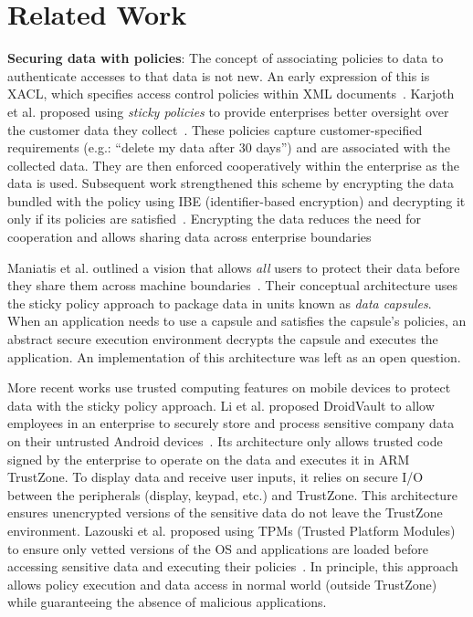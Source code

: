 \chapter{Related Work}
\label{sec:related}

\textbf{Securing data with policies}: The concept of associating policies to
data to authenticate accesses to that data is not new. An early expression of
this is XACL, which specifies access control policies within XML
documents~\cite{xacl}. Karjoth et al. proposed using {\em sticky policies} to
provide enterprises better oversight over the customer data they
collect~\cite{karjoth02enterprise}. These policies capture customer-specified
requirements (e.g.: ``delete my data after 30 days'') and are associated with
the collected data. They are then enforced cooperatively within the enterprise
as the data is used. Subsequent work strengthened this scheme by encrypting the
data bundled with the policy using IBE (identifier-based encryption) and
decrypting it only if its policies are satisfied~\cite{mont03stickypolicies,
  pearson11stickypolicies}. Encrypting the data reduces the need for cooperation
and allows sharing data across enterprise boundaries

Maniatis et al. outlined a vision that allows {\em all} users to protect their
data before they share them across machine boundaries~\cite{datacapsules}. Their
conceptual architecture uses the sticky policy approach to package data in units
known as {\em data capsules}. When an application needs to use a capsule and
satisfies the capsule's policies, an abstract secure execution environment
decrypts the capsule and executes the application. An implementation of this
architecture was left as an open question.

More recent works use trusted computing features on mobile devices to protect
data with the sticky policy approach. Li et al. proposed DroidVault to allow
employees in an enterprise to securely store and process sensitive company data
on their untrusted Android devices~\cite{li14droidvault}. Its architecture only
allows trusted code signed by the enterprise to operate on the data and executes
it in ARM TrustZone.  To display data and receive user inputs, it relies on
secure I/O between the peripherals (display, keypad, etc.) and TrustZone. This
architecture ensures unencrypted versions of the sensitive data do not leave the
TrustZone environment. Lazouski et al. proposed using TPMs (Trusted Platform
Modules) to ensure only vetted versions of the OS and applications are loaded
before accessing sensitive data and executing their
policies~\cite{lazouski14stateful}. In principle, this approach allows policy
execution and data access in normal world (outside TrustZone) while guaranteeing
the absence of malicious applications.

